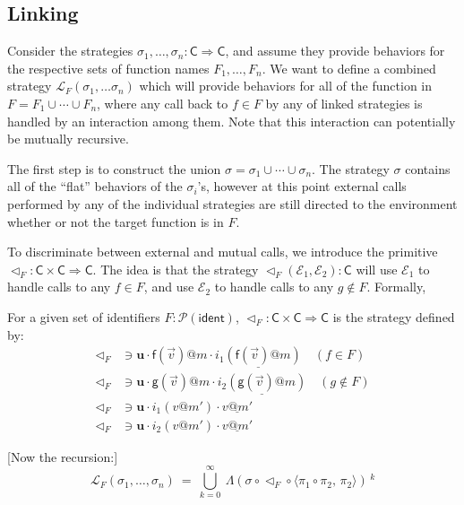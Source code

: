 \documentclass[acmsmall,anonymous]{acmart}
\makeatletter
\newcommand{\kw}[1]{\ensuremath{ \textsf{#1} }}
\newcommand{\EC}{\kw{C}}
\newcommand{\mcall}[3]{\kw{#1}({#2})@{#3}}
\newcommand{\mret}[2]{{#1}@{#2}}
\newcommand{\pret}[2]{%
  \underline{\mret{#1}{#2}}%
}
\makeatother
\begin{document}

\subsection{Linking} %

Consider the strategies
$\sigma_1, \ldots, \sigma_n : \EC \Rightarrow \EC$,
and assume they provide behaviors
for the respective sets of function names $F_1, \ldots, F_n$.
We want to define
a combined strategy $\mathcal{L}_F(\sigma_1, \ldots \sigma_n)$
which will provide behaviors for
all of the function in $F = F_1 \cup \cdots \cup F_n$,
where any call back to $f \in F$ by any of linked strategies
is handled by an interaction among them.
Note that this interaction
can potentially be mutually recursive.

The first step is to construct the union
$\sigma = \sigma_1 \cup \cdots \cup \sigma_n$.
The strategy $\sigma$
contains all of the ``flat'' behaviors of the $\sigma_i$'s,
however at this point
external calls performed by any of the individual strategies
are still directed to the environment
whether or not the target function is in $F$.

To discriminate between external and mutual calls,
we introduce the primitive $\lhd_F : \EC \times \EC \Rightarrow \EC$.
The idea is that the strategy $\lhd_F(\mathcal{E}_1, \mathcal{E}_2) : \EC$
will use $\mathcal{E}_1$ to handle calls to any $f \in F$,
and use $\mathcal{E}_2$ to handle calls to any $g \notin F$.
Formally,
\begin{definition}[$\lhd_F$]
For a given set of identifiers $F : \mathcal{P}(\kw{ident})$,
$\lhd_F : \EC \times \EC \Rightarrow \EC$ is the strategy defined by:
\begin{align*}
  \lhd_F &\ni
    \mathbf{u} \cdot
    \mcall{f}{\vec{v}}{m} \cdot
    \underline{i_1(\mcall{f}{\vec{v}}{m})}
    \quad (f \in F) \\
  \lhd_F &\ni
    \mathbf{u} \cdot
    \mcall{g}{\vec{v}}{m} \cdot
    \underline{i_2(\mcall{g}{\vec{v}}{m})}
    \quad (g \notin F) \\
  \lhd_F &\ni
    \mathbf{u} \cdot
    i_1(\mret{v}{m'}) \cdot
    \pret{v}{m'} \\
  \lhd_F &\ni
    \mathbf{u} \cdot
    i_2(\mret{v}{m'}) \cdot
    \pret{v}{m'}
\end{align*}
\end{definition}

[Now the recursion:]
\[
  \mathcal{L}_F(\sigma_1, \ldots, \sigma_n) \ =\ 
    \bigcup_{k=0}^\infty\ 
    \Lambda ( \sigma \circ \lhd_F \circ \langle \pi_1 \circ \pi_2, \, \pi_2 \rangle ) \,^k
\]
\end{document}
